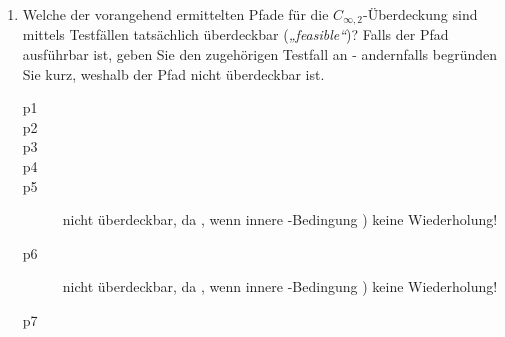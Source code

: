 \documentclass{bschlangaul-aufgabe}
\begin{document}
\begin{enumerate}
\begin{enumerate}
\begin{bAntwort}
\begin{description}
\end{description}
\end{bAntwort}
\end{enumerate}

mit \textbf{minimaler} Testfallanzahl und \textbf{möglichst kurzen}
Pfaden genügen würden.


\item Welche der vorangehend ermittelten Pfade für die
$C_{\infty,2}$-Überdeckung sind mittels Testfällen tatsächlich
überdeckbar (\emph{„feasible“})? Falls der Pfad ausführbar ist, geben
Sie den zugehörigen Testfall an - andernfalls begründen Sie kurz,
weshalb der Pfad nicht überdeckbar ist.

\begin{bAntwort}
\begin{description}
\item[p1] 

\item[p2] 

\item[p3] 

\item[p4] 

\item[p5]
nicht überdeckbar, da , wenn innere
-Bedingung ) keine Wiederholung!

\item[p6]
nicht überdeckbar, da , wenn innere
-Bedingung ) keine Wiederholung!

\item[p7] 
\end{description}
\end{bAntwort}


\end{enumerate}
\end{document}
